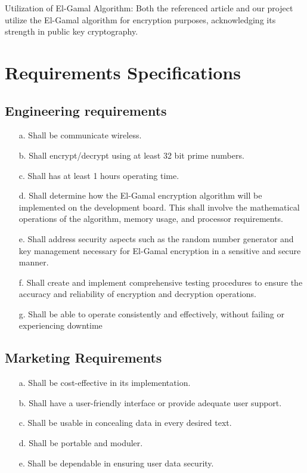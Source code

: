 \documentclass[12pt]{article}
\begin{document}
		Utilization of El-Gamal Algorithm: Both the referenced article and our project utilize the El-Gamal algorithm for encryption purposes, acknowledging its strength in public key cryptography.
		

		
	
	
	\section{Requirements Specifications}
		
	\subsection{Engineering requirements}
	\begin{enumerate}
		\item[a.] Shall be communicate wireless.
		\item[b.] Shall encrypt/decrypt using at least 32 bit prime numbers.
		\item[c.] Shall has at least 1 hours operating time.
		\item[d.] Shall determine how the El-Gamal encryption algorithm will be implemented on the development board. This shall involve the mathematical operations of the algorithm, memory usage, and processor requirements. 
		\item[e.] Shall address security aspects such as the random number generator and key management necessary for El-Gamal encryption in a sensitive and secure manner.
		\item[f.] Shall create and implement comprehensive testing procedures to ensure the accuracy and reliability of encryption and decryption operations.
		\item[g.] Shall be able to operate consistently and effectively, without failing or
		experiencing downtime
				
	\end{enumerate}
	\subsection{Marketing Requirements}
	\begin{enumerate}
		\item[a.] Shall be cost-effective in its implementation.
		\item[b.] Shall have a user-friendly interface or provide adequate user support.
		\item[c.] Shall be usable in concealing data in every desired text.
		\item[d.] Shall be portable and moduler.
		\item[e.] Shall be dependable in ensuring user data security.				
	\end{enumerate}
\end{document}

